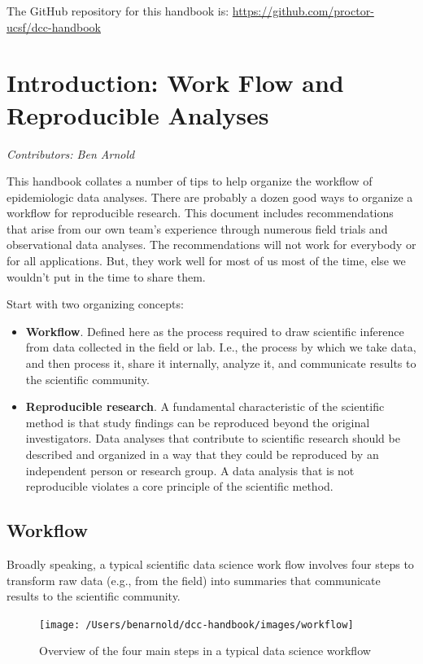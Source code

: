 \documentclass[]{book}
\begin{document}
The GitHub repository for this handbook is: \url{https://github.com/proctor-ucsf/dcc-handbook}

\hypertarget{intro}{%
\chapter{Introduction: Work Flow and Reproducible Analyses}\label{intro}}

\emph{Contributors: Ben Arnold}

This handbook collates a number of tips to help organize the workflow of epidemiologic data analyses. There are probably a dozen good ways to organize a workflow for reproducible research. This document includes recommendations that arise from our own team's experience through numerous field trials and observational data analyses. The recommendations will not work for everybody or for all applications. But, they work well for most of us most of the time, else we wouldn't put in the time to share them.

Start with two organizing concepts:

\begin{itemize}
\item
  \textbf{Workflow}. Defined here as the process required to draw scientific inference from data collected in the field or lab. I.e., the process by which we take data, and then process it, share it internally, analyze it, and communicate results to the scientific community.
\item
  \textbf{Reproducible research}. A fundamental characteristic of the scientific method is that study findings can be reproduced beyond the original investigators. Data analyses that contribute to scientific research should be described and organized in a way that they could be reproduced by an independent person or research group. A data analysis that is not reproducible violates a core principle of the scientific method.
\end{itemize}

\hypertarget{workflow}{%
\section{Workflow}\label{workflow}}

Broadly speaking, a typical scientific data science work flow involves four steps to transform raw data (e.g., from the field) into summaries that communicate results to the scientific community.

\begin{figure}
\texttt{[image: /Users/benarnold/dcc-handbook/images/workflow]} \caption{Overview of the four main steps in a typical data science workflow}\label{fig:fig-workflow}
\end{figure}
\end{document}
